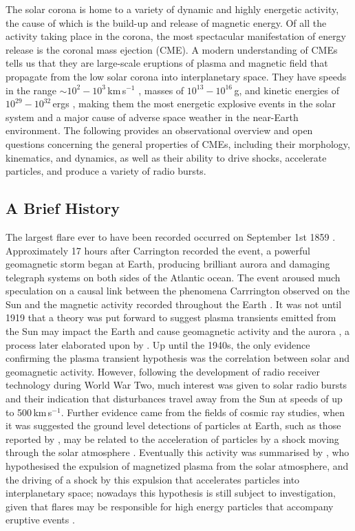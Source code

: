 The solar corona is home to a variety of dynamic and highly energetic activity, the cause of which is the build-up and release of magnetic energy. Of all the activity taking place in the corona, the most spectacular manifestation of energy release is the coronal mass ejection (CME). A modern understanding of CMEs tells us that they are large-scale eruptions of plasma and magnetic field that propagate from the low solar corona into interplanetary space. They have speeds in the range {\color{blue}$\sim10^2-10^3$\,km$\,$s$^{-1}$ \citep{yurch2005}}, masses of $10^{13}-10^{16}$\,g, and kinetic energies of $10^{29} - 10^{32}$\,ergs \citep{vour2010}, making them the most energetic explosive events in the solar system and a major cause of adverse space weather in the near-Earth environment. The following provides an observational overview and open questions concerning the general properties of CMEs, including their morphology, kinematics, and dynamics, as well as their ability to drive shocks, accelerate particles, and produce a variety of radio bursts.

\subsection{A Brief History}\label{sec:20}

The largest flare ever to have been recorded occurred on September 1st 1859 \citep{carrington1859}. Approximately 17 hours after Carrington recorded the event, a powerful geomagnetic storm began at Earth, producing brilliant aurora and damaging telegraph systems on both sides of the Atlantic ocean. The event aroused much speculation on a causal link between the phenomena Carrrington observed on the Sun and the magnetic activity recorded throughout the Earth \citep{balfour1861}. It was not until 1919 that a theory was put forward to suggest plasma transients emitted from the Sun may impact the Earth and cause geomagnetic activity and the aurora \citep{lindemann1919}, a process later elaborated upon by \citet{chapman1930}. Up until the 1940s, the only evidence confirming the plasma transient hypothesis was the correlation between solar and geomagnetic activity. However, following the development of radio receiver technology during World War Two, much interest was given to solar radio bursts and their indication that disturbances travel away from the Sun at speeds of up to 500\,km\,s$^{-1}$\citep{wild1958}. Further evidence came from the fields of cosmic ray studies, when it was suggested the ground level detections of particles at Earth, such as those reported by \citet{forbush1946}, may be related to the acceleration of particles by a shock moving through the solar atmosphere \citep{wild1963}. Eventually this activity was summarised by \citet{gold1962}, who hypothesised the expulsion of magnetized plasma from the solar atmosphere, and the driving of a shock by this expulsion that accelerates particles into interplanetary space; {\color{blue} nowadays this hypothesis is still subject to investigation, given that flares may be responsible for high energy particles that accompany eruptive events \citep{kahler2007}}. 

